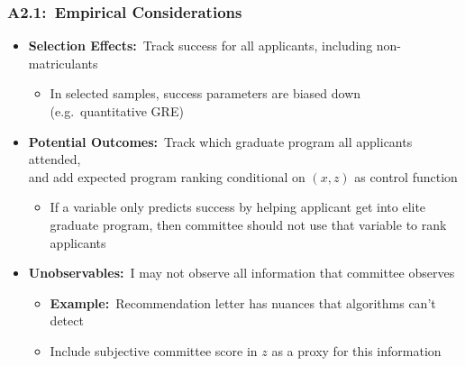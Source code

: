 \documentclass[12pt, aspectratio=169]{beamer}
\begin{document}
\begin{frame}[label=ec]
\frametitle{A2.1:\ Empirical Considerations}
\begin{itemize}
\item \textbf{Selection Effects:}\ Track success for all applicants, including non-matriculants
\vspace{5pt}
\begin{itemize}
\item In selected samples, success parameters are biased down (e.g.\ quantitative GRE)
\vspace{10pt}
\end{itemize}
\item \textbf{Potential Outcomes:}\ Track which graduate program all applicants attended, \\ and add expected program ranking conditional on $(x,z)$ as control function
\vspace{5pt}
\begin{itemize}
\item If a variable only predicts success by helping applicant get into elite graduate program, then committee should not use that variable to rank applicants
\vspace{10pt}
\end{itemize}
\item \textbf{Unobservables:}\ I may not observe all information that committee observes
\vspace{5pt}
\begin{itemize}
\item \textbf{Example:}\ Recommendation letter has nuances that algorithms can't detect
\vspace{5pt}
\item Include subjective committee score in $z$ as a proxy for this information
\vspace{5pt}
\end{itemize}
\end{itemize}
\hyperlink{cpi}{}
\end{frame}
\end{document}
